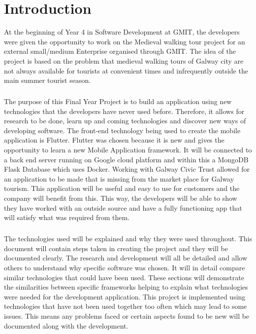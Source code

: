 \chapter{Introduction}

At the beginning of Year 4 in Software Development at GMIT, the developers were given the opportunity to work on the Medieval walking tour project for an external small/medium Enterprise organised through GMIT. The idea of the project is based on the problem that medieval walking tours of Galway city are not always available for tourists at convenient times and infrequently outside the main summer tourist season. 
\paragraph{}The purpose of this Final Year Project is to build an application using new technologies that the developers have never used before. Therefore, it allows for research to be done, learn up and coming technologies and discover new ways of developing software. The front-end technology being used to create the mobile application is Flutter. Flutter was chosen because it is new and gives the opportunity to learn a new Mobile Application framework. It will be connected to a back end server running on Google cloud platform and within this a MongoDB Flask Database which uses Docker. Working with Galway Civic Trust allowed for an application to be made that is missing from the market place for Galway tourism. This application will be useful and easy to use for customers and the company will benefit from this.  This way, the developers will be able to show they have worked with an outside source and have a fully functioning app that will satisfy what was required from them.
\paragraph{}The technologies used will be explained and why they were used throughout. This document will contain steps taken in creating the project and they will be documented clearly. The research and development will all be detailed and allow others to understand why specific software was chosen. It will in detail compare similar technologies that could have been used. These sections will demonstrate the similarities between specific frameworks helping to explain what technologies were needed for the development application. This project is implemented using technologies that have not been used together too often which may lead to some issues. This means any problems faced or certain aspects found to be new will be documented along with the development.
